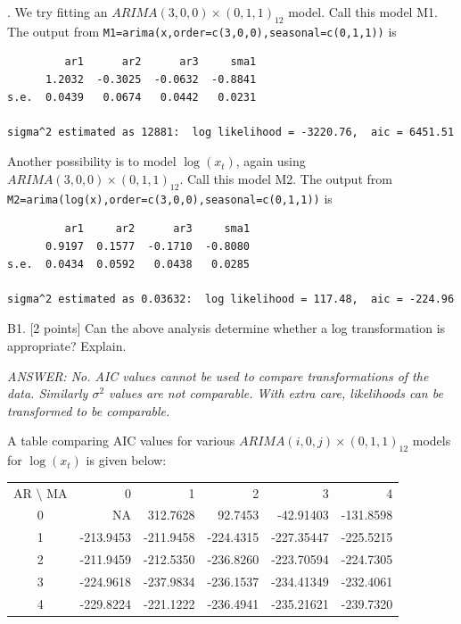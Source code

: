 \documentclass[11pt]{article}
\def\ans{\it ANSWER: }
\begin{document}

. We try fitting an
$ARIMA(3,0,0)\times(0,1,1)_{12}$ model. Call this model M1. The output from {\texttt{M1=arima(x,order=c(3,0,0),seasonal=c(0,1,1))}} is
\vspace{-3mm}
\begin{verbatim}
         ar1      ar2      ar3     sma1
      1.2032  -0.3025  -0.0632  -0.8841
s.e.  0.0439   0.0674   0.0442   0.0231

sigma^2 estimated as 12881:  log likelihood = -3220.76,  aic = 6451.51
\end{verbatim}

Another possibility is to model %
$\log(x_t)$, again using 
$ARIMA(3,0,0)\times(0,1,1)_{12}$. Call this model M2. The output from 
\texttt{M2=arima(log(x),order=c(3,0,0),seasonal=c(0,1,1))}
is
\vspace{-3mm}
\begin{verbatim}
         ar1     ar2      ar3     sma1
      0.9197  0.1577  -0.1710  -0.8080
s.e.  0.0434  0.0592   0.0438   0.0285

sigma^2 estimated as 0.03632:  log likelihood = 117.48,  aic = -224.96
\end{verbatim}

B1. [2 points] Can the above analysis determine whether a log
transformation is appropriate? Explain.

{\ans No. AIC values cannot be used to compare transformations of
the data. Similarly $\sigma^2$ values are not comparable. With
extra care, likelihoods can be transformed to be comparable.}


A table comparing AIC values for various
$ARIMA(i,0,j)\times(0,1,1)_{12}$ models for $\log(x_t)$ is given below:

\begin{tabular}{crrrrr}
AR $\setminus$ MA & 0 & 1 & 2& 3& 4\\
  0&        NA  &312.7628 &  92.7453  &-42.91403 &-131.8598\\
1& -213.9453 &-211.9458 &-224.4315 &-227.35447 &-225.5215\\
2& -211.9459 &-212.5350 &-236.8260 &-223.70594 &-224.7305\\
3& -224.9618 &-237.9834 &-236.1537 &-234.41349 &-232.4061\\
4& -229.8224 &-221.1222 &-236.4941 &-235.21621 &-239.7320\\
\end{tabular}
\end{document}
